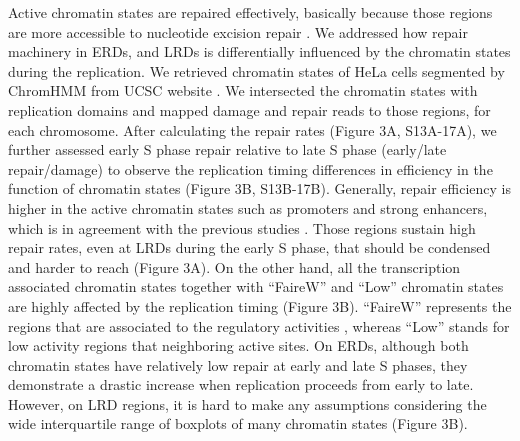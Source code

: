 Active chromatin states are repaired effectively, basically because those regions are more accessible to nucleotide excision repair \citep{adar2016genome}. We addressed how repair machinery in ERDs, and LRDs is differentially influenced by the chromatin states during the replication. We retrieved chromatin states of HeLa cells segmented by ChromHMM from UCSC website \citep{ernst2017chromatin}. We intersected the chromatin states with replication domains and mapped damage and repair reads to those regions, for each chromosome. After calculating the repair rates (Figure 3A, S13A-17A), we further assessed early S phase repair relative to late S phase (early/late repair/damage) to observe the replication timing differences in efficiency in the function of chromatin states (Figure 3B, S13B-17B). Generally, repair efficiency is higher in the active chromatin states such as promoters and strong enhancers, which is in agreement with the previous studies \citep{adar2016genome, hu2016cisplatin}. Those regions sustain high repair rates, even at LRDs during the early S phase, that should be condensed and harder to reach (Figure 3A). On the other hand, all the transcription associated chromatin states together with “FaireW” and “Low” chromatin states are highly affected by the replication timing (Figure 3B). “FaireW” represents the regions that are associated to the regulatory activities \citep{giresi2007faire}, whereas “Low” stands for low activity regions that neighboring active sites. On ERDs, although both chromatin states have relatively low repair at early and late S phases, they demonstrate a drastic increase when replication proceeds from early to late.  However, on LRD regions, it is hard to make any assumptions considering the wide interquartile range of boxplots of many chromatin states (Figure 3B).

